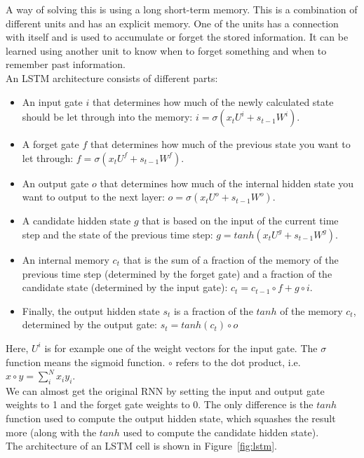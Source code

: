 \documentclass[a4paper, 11pt]{article}
\begin{document}
A way of solving this is using a long short-term memory. This is a combination of different units and has an explicit memory. One of the units has a connection with itself and is used to accumulate or forget the stored information. It can be learned using another unit to know when to forget something and when to remember past information.\\
An LSTM architecture consists of different parts:
\begin{itemize}
\item An input gate $i$ that determines how much of the newly calculated state should be let through into the memory: $i = \sigma (x_tU^i + s_{t-1}W^i)$.
\item A forget gate $f$ that determines how much of the previous state you want to let through: $f = \sigma (x_tU^f + s_{t-1}W^f)$.
\item An output gate $o$ that determines how much of the internal hidden state you want to output to the next layer: $o = \sigma (x_tU^o + s_{t-1}W^o)$.
\item A candidate hidden state $g$ that is based on the input of the current time step and the state of the previous time step: $g = tanh(x_tU^g + s_{t-1}W^g)$.
\item An internal memory $c_t$ that is the sum of a fraction of the memory of the previous time step (determined by the forget gate) and a fraction of the candidate state (determined by the input gate): $c_t = c_{t-1} \circ f + g \circ i$.
\item Finally, the output hidden state $s_t$ is a fraction of the $tanh$ of the memory $c_t$, determined by the output gate: $s_t = tanh(c_t) \circ o$
\end{itemize}
Here, $U^i$ is for example one of the weight vectors for the input gate. The $\sigma$ function means the sigmoid function. $\circ$ refers to the dot product, i.e. $x \circ y = \sum_i^N x_i y_i$.\\
We can almost get the original RNN by setting the input and output gate weights to 1 and the forget gate weights to 0. The only difference is the $tanh$ function used to compute the output hidden state, which squashes the result more (along with the $tanh$ used to compute the candidate hidden state).\\
The architecture of an LSTM cell is shown in Figure~\ref{fig:lstm}.
\end{document}
